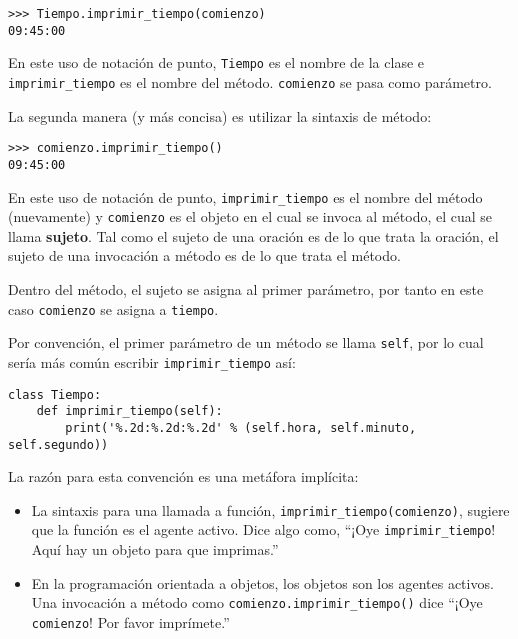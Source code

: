 \documentclass[10pt]{book}
\begin{document}
\begin{verbatim}
>>> Tiempo.imprimir_tiempo(comienzo)
09:45:00
\end{verbatim}
%
En este uso de notación de punto, {\tt Tiempo} es el nombre de la clase
e \verb"imprimir_tiempo" es el nombre del método.  {\tt comienzo} se
pasa como parámetro.

La segunda manera (y más concisa) es utilizar la sintaxis de método:

\begin{verbatim}
>>> comienzo.imprimir_tiempo()
09:45:00
\end{verbatim}
%
En este uso de notación de punto, \verb"imprimir_tiempo" es el nombre del
método (nuevamente) y {\tt comienzo} es el objeto en el cual se invoca
al método, el cual se llama {\bf sujeto}.  Tal como el
sujeto de una oración es de lo que trata la oración, el sujeto
de una invocación a método es de lo que trata el método.

Dentro del método, el sujeto se asigna al primer
parámetro, por tanto en este caso {\tt comienzo} se asigna
a {\tt tiempo}.

Por convención, el primer parámetro de un método se
llama {\tt self}, por lo cual sería más común escribir
\verb"imprimir_tiempo" así:

\begin{verbatim}
class Tiempo:
    def imprimir_tiempo(self):
        print('%.2d:%.2d:%.2d' % (self.hora, self.minuto, self.segundo))
\end{verbatim}
%
La razón para esta convención es una metáfora implícita:

\begin{itemize}

\item La sintaxis para una llamada a función, \verb"imprimir_tiempo(comienzo)",
  sugiere que la función es el agente activo.  Dice algo
  como, ``¡Oye \verb"imprimir_tiempo"!  Aquí hay un objeto para que imprimas.''

\item En la programación orientada a objetos, los objetos son los agentes
  activos.  Una invocación a método como \verb"comienzo.imprimir_tiempo()" dice
  ``¡Oye {\tt comienzo}!  Por favor imprímete.''

\end{itemize}
\end{document}
